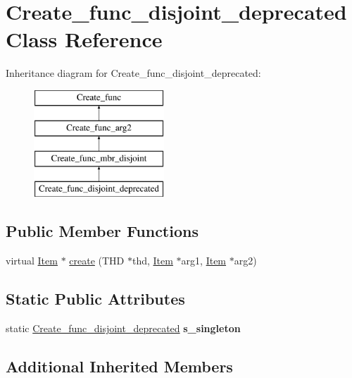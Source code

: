 \hypertarget{classCreate__func__disjoint__deprecated}{}\section{Create\+\_\+func\+\_\+disjoint\+\_\+deprecated Class Reference}
\label{classCreate__func__disjoint__deprecated}
Inheritance diagram for Create\+\_\+func\+\_\+disjoint\+\_\+deprecated\+:\begin{figure}[H]
\begin{center}
\leavevmode
\includegraphics[height=4.000000cm]{classCreate__func__disjoint__deprecated}
\end{center}
\end{figure}
\subsection*{Public Member Functions}
\begin{DoxyCompactItemize}
\item 
virtual \mbox{\hyperlink{classItem}{Item}} $\ast$ \mbox{\hyperlink{classCreate__func__disjoint__deprecated_a0699bb7bf47eb0fc759804fae0ca7c2c}{create}} (T\+HD $\ast$thd, \mbox{\hyperlink{classItem}{Item}} $\ast$arg1, \mbox{\hyperlink{classItem}{Item}} $\ast$arg2)
\end{DoxyCompactItemize}
\subsection*{Static Public Attributes}
\begin{DoxyCompactItemize}
\item 
\mbox{\label{classCreate__func__disjoint__deprecated_a4f83f7dec16f596abb9789770319288e}} 
static \mbox{\hyperlink{classCreate__func__disjoint__deprecated}{Create\+\_\+func\+\_\+disjoint\+\_\+deprecated}} {\bfseries s\+\_\+singleton}
\end{DoxyCompactItemize}
\subsection*{Additional Inherited Members}


